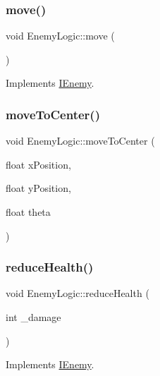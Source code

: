 \subsubsection{\texorpdfstring{move()}{move()}}
{\footnotesize\ttfamily void Enemy\+Logic\+::move (\begin{DoxyParamCaption}{ }\end{DoxyParamCaption})\hspace{0.3cm}{\ttfamily [virtual]}}



Implements \hyperlink{class_i_enemy_a0dbed8e8e15436305b6ede08b618c232}{I\+Enemy}.

\mbox{\label{class_enemy_logic_a560cc578db8a77f250b63a111f51125e}} 
\subsubsection{\texorpdfstring{move\+To\+Center()}{moveToCenter()}}
{\footnotesize\ttfamily void Enemy\+Logic\+::move\+To\+Center (\begin{DoxyParamCaption}\item[{float}]{x\+Position,  }\item[{float}]{y\+Position,  }\item[{float}]{theta }\end{DoxyParamCaption})}

\mbox{\label{class_enemy_logic_aaf2f8ff785c8f7410e04cfb3cb192b9b}} 
\subsubsection{\texorpdfstring{reduce\+Health()}{reduceHealth()}}
{\footnotesize\ttfamily void Enemy\+Logic\+::reduce\+Health (\begin{DoxyParamCaption}\item[{int}]{\+\_\+damage }\end{DoxyParamCaption})\hspace{0.3cm}{\ttfamily [virtual]}}



Implements \hyperlink{class_i_enemy_acbc451cafee99cb405d9d9248820b6ea}{I\+Enemy}.

